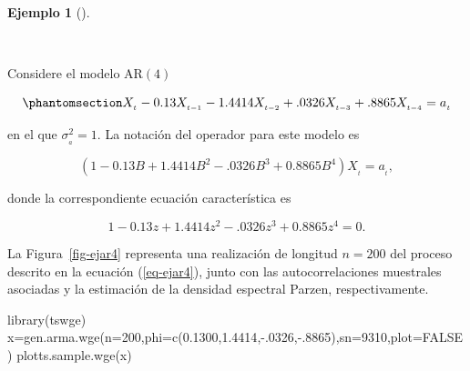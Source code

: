 \documentclass[
  us-letterpaper,
]{scrreprt}
\newenvironment{Shaded}{\begin{snugshade}}{\end{snugshade}}
\newcommand{\AttributeTok}[1]{\textcolor[rgb]{0.40,0.45,0.13}{#1}}
\newcommand{\ConstantTok}[1]{\textcolor[rgb]{0.56,0.35,0.01}{#1}}
\newcommand{\DecValTok}[1]{\textcolor[rgb]{0.68,0.00,0.00}{#1}}
\newcommand{\FloatTok}[1]{\textcolor[rgb]{0.68,0.00,0.00}{#1}}
\newcommand{\FunctionTok}[1]{\textcolor[rgb]{0.28,0.35,0.67}{#1}}
\newcommand{\NormalTok}[1]{\textcolor[rgb]{0.00,0.23,0.31}{#1}}
\newcommand{\OtherTok}[1]{\textcolor[rgb]{0.00,0.23,0.31}{#1}}
\newcommand{\SpecialCharTok}[1]{\textcolor[rgb]{0.37,0.37,0.37}{#1}}
\theoremstyle{plain}
\theoremstyle{definition}
\theoremstyle{definition}
\newtheorem{example}{Ejemplo}[chapter]
\theoremstyle{plain}
\theoremstyle{remark}
\begin{document}
\begin{example}[]\protect\hypertarget{exm-ar4}{}\label{exm-ar4}

~

\begin{tcolorbox}[enhanced jigsaw, breakable, colbacktitle=quarto-callout-caution-color!10!white, rightrule=.15mm, toptitle=1mm, colback=white, left=2mm, colframe=quarto-callout-caution-color-frame, bottomtitle=1mm, opacitybacktitle=0.6, leftrule=.75mm, arc=.35mm, title={Un modelo \(\mathrm{AR}(4)\)}, coltitle=black, titlerule=0mm, opacityback=0, bottomrule=.15mm, toprule=.15mm]

Considere el modelo \(\mathrm{AR}(4)\)

\begin{equation}\phantomsection\label{eq-ejar4}{
X_{_t}-0.13X_{_{t-1}}-1.4414X_{_{t-2}}+.0326X_{_{t-3}}+.8865X_{_{t-4}}=a_{_{t}}
}\end{equation}

en el que \(\sigma_{_a}^2 = 1\). La notación del operador para este
modelo es

\[ (1 - 0.13B + 1.4414B^2 - .0326B^3 + 0.8865 B^4)X_{_t}= a_{_t},\]

donde la correspondiente ecuación característica es

\[1 - 0.13z + 1.4414z^2 - .0326z^3 + 0.8865 z^4 = 0.\]

La Figura~\ref{fig-ejar4} representa una realización de longitud
\(n = 200\) del proceso descrito en la ecuación (\ref{eq-ejar4}), junto
con las autocorrelaciones muestrales asociadas y la estimación de la
densidad espectral Parzen, respectivamente.

\begin{Shaded}
\begin{Highlighting}[]
\FunctionTok{library}\NormalTok{(tswge)}
\NormalTok{x}\OtherTok{=}\FunctionTok{gen.arma.wge}\NormalTok{(}\AttributeTok{n=}\DecValTok{200}\NormalTok{,}\AttributeTok{phi=}\FunctionTok{c}\NormalTok{(}\FloatTok{0.1300}\NormalTok{,}\FloatTok{1.4414}\NormalTok{,}\SpecialCharTok{{-}}\NormalTok{.}\DecValTok{0326}\NormalTok{,}\SpecialCharTok{{-}}\NormalTok{.}\DecValTok{8865}\NormalTok{),}\AttributeTok{sn=}\DecValTok{9310}\NormalTok{,}\AttributeTok{plot=}\ConstantTok{FALSE}\NormalTok{)}
\FunctionTok{plotts.sample.wge}\NormalTok{(x)}
\end{Highlighting}
\end{Shaded}

\begin{figure}[H]


\end{figure}
\end{tcolorbox}
\end{example}
\end{document}
